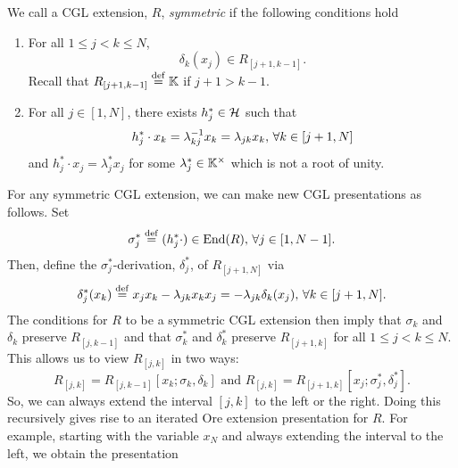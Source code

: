 \begin{definition}
	We call a CGL extension, $R$, \emph{symmetric} if the following conditions hold
	\begin{enumerate}
		\item For all $1\leq j < k \leq N$,
		      \begin{equation*}
			      \delta_k (x_j) \in R_{[j+1, k-1]}.
		      \end{equation*}
		      Recall that $R_{[j+1,k-1]} \overset{\mathrm{def}}{=} \mathbb{K}$ if $j +1 > k-1$.
		\item For all $j \in [1, N]$, there exists $h^*_j \in \mathcal{H}$ such that
		      \begin{equation*}
			      h^*_j \cdot x_k = \lambda_{kj}^{-1} x_k = \lambda_{jk}x_k, \, \forall k \in [j+1, N]
		      \end{equation*}
		      and $h^*_j \cdot x_j = \lambda^*_j x_j$ for some $\lambda_j^*\in \mathbb{K}^\times$ which is not a root of unity.
	\end{enumerate}
\end{definition}
For any symmetric CGL extension, we can make new CGL presentations as follows. Set
\begin{equation}\label{eq:sigma_star}
	\sigma_j^* \overset{\mathrm{def}}{=} (h_j^* \cdot) \in \operatorname{End}(R),\, \forall j \in [1, N-1].
\end{equation}
Then, define the $\sigma_j^*$-derivation, $\delta_j^*$, of $R_{[j+1, N]}$ via
\begin{equation}\label{eq:delta_star}
	\delta_j^*(x_k) \overset{\mathrm{def}}{=} x_j x_k - \lambda_{jk}x_kx_j = -\lambda_{jk} \delta_k (x_j), \, \forall k \in [j+1, N].
\end{equation}
%
The conditions for $R$ to be a symmetric CGL extension then imply that $\sigma_k$ and
$\delta_k$ preserve $R_{[j, k-1]}$ and that $\sigma_k^*$ and $\delta_k^*$ preserve
$R_{[j+1, k]}$ for all $1 \leq j < k \leq N$. This allows us to view $R_{[j, k]}$ in
two ways:
\begin{equation*}
	R_{[j, k]} = R_{[j, k-1]}[x_k; \sigma_k, \delta_k] \text{ and } R_{[j,k]} = R_{[j+1, k]}[x_j; \sigma_j^*, \delta_j^*].
\end{equation*}
So, we can always extend the interval $[j, k]$ to the left or the right. Doing this recursively gives rise to an iterated Ore extension presentation for $R$. For example, starting with the variable $x_N$ and always extending the interval to the left, we obtain the presentation
